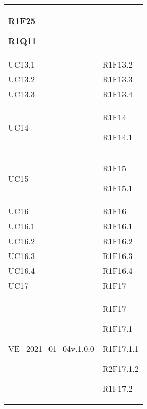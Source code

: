 \begin{center}
\begin{longtable}{|p{44mm}|p{22mm}|}
R1F25 \newline

R1Q11 \newline
\\
\hline
UC13.1 &

R1F13.2 \newline
\\
\hline
UC13.2 &

R1F13.3 \newline
\\
\hline
UC13.3 &

R1F13.4 \newline
\\
\hline
UC14 &

R1F14 \newline

R1F14.1 \newline
\\
\hline
UC15 &

R1F15 \newline

R1F15.1 \newline
\\
\hline
UC16 &

R1F16 \newline
\\
\hline
UC16.1 &

R1F16.1 \newline
\\
\hline
UC16.2 &

R1F16.2 \newline
\\
\hline
UC16.3 &

R1F16.3 \newline
\\
\hline
UC16.4 &

R1F16.4 \newline
\\
\hline
UC17 &

R1F17 \newline
\\
\hline
VE\_2021\_01\_04v.1.0.0 &

R1F17 \newline

R1F17.1 \newline

R1F17.1.1 \newline

R2F17.1.2 \newline

R1F17.2 \newline


\end{longtable}
\end{center}
